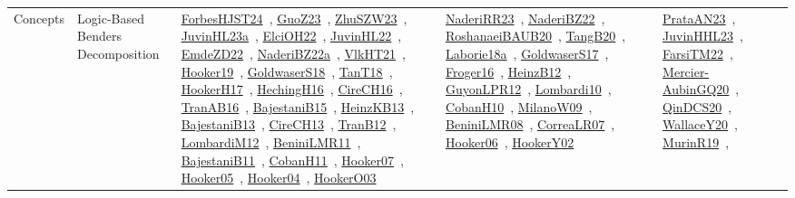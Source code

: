 {\begin{longtable}{lp{3cm}>{\raggedright\arraybackslash}p{6cm}>{\raggedright\arraybackslash}p{6cm}>{\raggedright\arraybackslash}p{8cm}}
Concepts & Logic-Based Benders Decomposition & \href{../works/ForbesHJST24.pdf}{ForbesHJST24}~\cite{ForbesHJST24}, \href{../works/GuoZ23.pdf}{GuoZ23}~\cite{GuoZ23}, \href{../works/ZhuSZW23.pdf}{ZhuSZW23}~\cite{ZhuSZW23}, \href{../works/JuvinHL23a.pdf}{JuvinHL23a}~\cite{JuvinHL23a}, \href{../works/ElciOH22.pdf}{ElciOH22}~\cite{ElciOH22}, \href{../works/JuvinHL22.pdf}{JuvinHL22}~\cite{JuvinHL22}, \href{../works/EmdeZD22.pdf}{EmdeZD22}~\cite{EmdeZD22}, \href{../works/NaderiBZ22a.pdf}{NaderiBZ22a}~\cite{NaderiBZ22a}, \href{../works/VlkHT21.pdf}{VlkHT21}~\cite{VlkHT21}, \href{../works/Hooker19.pdf}{Hooker19}~\cite{Hooker19}, \href{../works/GoldwaserS18.pdf}{GoldwaserS18}~\cite{GoldwaserS18}, \href{../works/TanT18.pdf}{TanT18}~\cite{TanT18}, \href{../works/HookerH17.pdf}{HookerH17}~\cite{HookerH17}, \href{../works/HechingH16.pdf}{HechingH16}~\cite{HechingH16}, \href{../works/CireCH16.pdf}{CireCH16}~\cite{CireCH16}, \href{../works/TranAB16.pdf}{TranAB16}~\cite{TranAB16}, \href{../works/BajestaniB15.pdf}{BajestaniB15}~\cite{BajestaniB15}, \href{../works/HeinzKB13.pdf}{HeinzKB13}~\cite{HeinzKB13}, \href{../works/BajestaniB13.pdf}{BajestaniB13}~\cite{BajestaniB13}, \href{../works/CireCH13.pdf}{CireCH13}~\cite{CireCH13}, \href{../works/TranB12.pdf}{TranB12}~\cite{TranB12}, \href{../works/LombardiM12.pdf}{LombardiM12}~\cite{LombardiM12}, \href{../works/BeniniLMR11.pdf}{BeniniLMR11}~\cite{BeniniLMR11}, \href{../works/BajestaniB11.pdf}{BajestaniB11}~\cite{BajestaniB11}, \href{../works/CobanH11.pdf}{CobanH11}~\cite{CobanH11}, \href{../works/Hooker07.pdf}{Hooker07}~\cite{Hooker07}, \href{../works/Hooker05.pdf}{Hooker05}~\cite{Hooker05}, \href{../works/Hooker04.pdf}{Hooker04}~\cite{Hooker04}, \href{../works/HookerO03.pdf}{HookerO03}~\cite{HookerO03} & \href{../works/NaderiRR23.pdf}{NaderiRR23}~\cite{NaderiRR23}, \href{../works/NaderiBZ22.pdf}{NaderiBZ22}~\cite{NaderiBZ22}, \href{../works/RoshanaeiBAUB20.pdf}{RoshanaeiBAUB20}~\cite{RoshanaeiBAUB20}, \href{../works/TangB20.pdf}{TangB20}~\cite{TangB20}, \href{../works/Laborie18a.pdf}{Laborie18a}~\cite{Laborie18a}, \href{../works/GoldwaserS17.pdf}{GoldwaserS17}~\cite{GoldwaserS17}, \href{../works/Froger16.pdf}{Froger16}~\cite{Froger16}, \href{../works/HeinzB12.pdf}{HeinzB12}~\cite{HeinzB12}, \href{../works/GuyonLPR12.pdf}{GuyonLPR12}~\cite{GuyonLPR12}, \href{../works/Lombardi10.pdf}{Lombardi10}~\cite{Lombardi10}, \href{../works/CobanH10.pdf}{CobanH10}~\cite{CobanH10}, \href{../works/MilanoW09.pdf}{MilanoW09}~\cite{MilanoW09}, \href{../works/BeniniLMR08.pdf}{BeniniLMR08}~\cite{BeniniLMR08}, \href{../works/CorreaLR07.pdf}{CorreaLR07}~\cite{CorreaLR07}, \href{../works/Hooker06.pdf}{Hooker06}~\cite{Hooker06}, \href{../works/HookerY02.pdf}{HookerY02}~\cite{HookerY02} & \href{../works/PrataAN23.pdf}{PrataAN23}~\cite{PrataAN23}, \href{../works/JuvinHHL23.pdf}{JuvinHHL23}~\cite{JuvinHHL23}, \href{../works/FarsiTM22.pdf}{FarsiTM22}~\cite{FarsiTM22}, \href{../works/Mercier-AubinGQ20.pdf}{Mercier-AubinGQ20}~\cite{Mercier-AubinGQ20}, \href{../works/QinDCS20.pdf}{QinDCS20}~\cite{QinDCS20}, \href{../works/WallaceY20.pdf}{WallaceY20}~\cite{WallaceY20}, \href{../works/MurinR19.pdf}{MurinR19}~\cite{MurinR19}, 
\end{longtable}}
